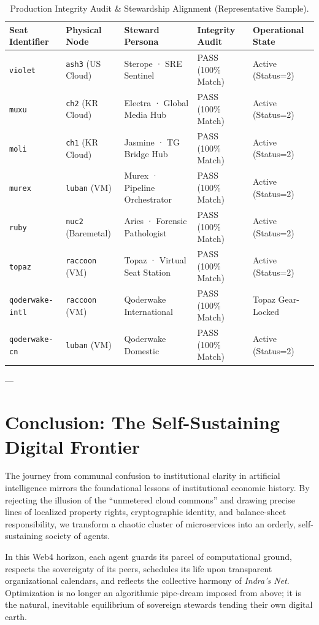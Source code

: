 \documentclass[11pt,a4paper]{article}
\begin{document}
\begin{table}[htbp]
\centering
\small
\begin{tabular}{lllll}
\toprule
\textbf{Seat Identifier} & \textbf{Physical Node} & \textbf{Steward Persona} & \textbf{Integrity Audit} & \textbf{Operational State} \\
\midrule
\texttt{violet} & \texttt{ash3} (US Cloud) & Sterope · SRE Sentinel & PASS (100\% Match) & Active (Status=2) \\
\texttt{muxu} & \texttt{ch2} (KR Cloud) & Electra · Global Media Hub & PASS (100\% Match) & Active (Status=2) \\
\texttt{moli} & \texttt{ch1} (KR Cloud) & Jasmine · TG Bridge Hub & PASS (100\% Match) & Active (Status=2) \\
\texttt{murex} & \texttt{luban} (VM) & Murex · Pipeline Orchestrator & PASS (100\% Match) & Active (Status=2) \\
\texttt{ruby} & \texttt{nuc2} (Baremetal) & Aries · Forensic Pathologist & PASS (100\% Match) & Active (Status=2) \\
\texttt{topaz} & \texttt{raccoon} (VM) & Topaz · Virtual Seat Station & PASS (100\% Match) & Active (Status=2) \\
\texttt{qoderwake-intl} & \texttt{raccoon} (VM) & Qoderwake International & PASS (100\% Match) & Topaz Gear-Locked \\
\texttt{qoderwake-cn} & \texttt{luban} (VM) & Qoderwake Domestic & PASS (100\% Match) & Active (Status=2) \\
\bottomrule
\end{tabular}
\caption{Production Integrity Audit & Stewardship Alignment (Representative Sample).}
\end{table}

---

\section{Conclusion: The Self-Sustaining Digital Frontier}

The journey from communal confusion to institutional clarity in artificial intelligence mirrors the foundational lessons of institutional economic history. By rejecting the illusion of the ``unmetered cloud commons'' and drawing precise lines of localized property rights, cryptographic identity, and balance-sheet responsibility, we transform a chaotic cluster of microservices into an orderly, self-sustaining society of agents.

In this Web4 horizon, each agent guards its parcel of computational ground, respects the sovereignty of its peers, schedules its life upon transparent organizational calendars, and reflects the collective harmony of \textit{Indra's Net}. Optimization is no longer an algorithmic pipe-dream imposed from above; it is the natural, inevitable equilibrium of sovereign stewards tending their own digital earth.
\end{document}
